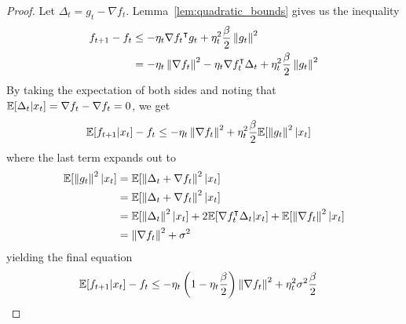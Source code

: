 \begin{proof}
    Let $\Delta_t = g_t - \nabla f_t$. Lemma~\ref{lem:quadratic_bounds} gives us
    the inequality
    \begin{equation}
        \begin{aligned}
            f_{t+1} - f_t &\leq - \eta_t {\nabla f_t}^\intercal g_t +
            \eta_t^2\frac{\beta}{2} \left\| g_t \right\|^2 \\
            &= - \eta_t \left\| \nabla f_t \right\|^2 - \eta_t \nabla f_t^\intercal \Delta_t +
            \eta_t^2\frac{\beta}{2} \left\| g_t \right\|^2
        \end{aligned}
    \end{equation}
    By taking the expectation of both sides and noting that $\mathbb E[\Delta_t |
    x_t] = \nabla f_t - \nabla f_t = 0$, we get
    \begin{equation}
        \begin{aligned}
            \mathbb E[f_{t+1} | x_t] - f_t &\leq - \eta_t \left\| \nabla f_t \right\|^2 +
            \eta_t^2\frac{\beta}{2} \mathbb E[\left\| g_t \right\|^2 | x_t]
        \end{aligned}
    \end{equation}
    where the last term expands out to
    \begin{equation}
        \begin{aligned}
            \mathbb E[\left\| g_t \right\|^2 | x_t] &= \mathbb E[\left\| \Delta_t + \nabla f_t \right\|^2 | x_t]
            \\
            &= \mathbb E[\left\| \Delta_t + \nabla f_t \right\|^2 | x_t] \\
            &= \mathbb E[\left\| \Delta_t \right\|^2 | x_t] + 2 \mathbb E[\nabla f_t^\intercal \Delta_t
            | x_t] + \mathbb E[\left\| \nabla f_t \right\|^2 | x_t] \\
            &= \left\| \nabla f_t \right\|^2 + \sigma^2
        \end{aligned}
    \end{equation}
    yielding the final equation
    \begin{equation}
        \begin{aligned}
            \mathbb E[f_{t+1} | x_t] - f_t &\leq - \eta_t \left( 1 - \eta_t
            \frac{\beta}{2}  \right) \left\| \nabla f_t \right\|^2 +
             \eta_t^2\sigma^2 \frac{\beta}{2} 
        \end{aligned}
    \end{equation}
\end{proof}
